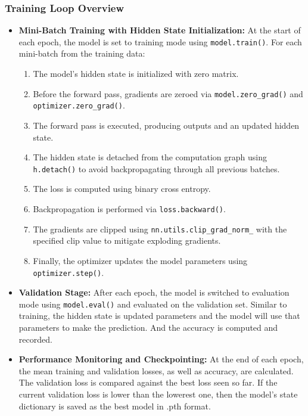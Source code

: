 \documentclass[12pt,a4paper]{article}
\begin{document}
\subsubsection{Training Loop Overview}
\begin{itemize}
    \item \textbf{Mini-Batch Training with Hidden State Initialization:}  
    At the start of each epoch, the model is set to training mode using \texttt{model.train()}. For each mini-batch from the training data:
    \begin{enumerate}
        \item The model’s hidden state is initialized with zero matrix.
        \item Before the forward pass, gradients are zeroed via \texttt{model.zero\_grad()} and \texttt{optimizer.zero\_grad()}.
        \item The forward pass is executed, producing outputs and an updated hidden state.
        \item The hidden state is detached from the computation graph using \texttt{h.detach()} to avoid backpropagating through all previous batches.
        \item The loss is computed using binary cross entropy.
        \item Backpropagation is performed via \texttt{loss.backward()}.
        \item The gradients are clipped using \texttt{nn.utils.clip\_grad\_norm\_} with the specified clip value to mitigate exploding gradients.
        \item Finally, the optimizer updates the model parameters using \texttt{optimizer.step()}.
    \end{enumerate}
    
    \item \textbf{Validation Stage:}  
    After each epoch, the model is switched to evaluation mode using \texttt{model.eval()} and evaluated on the validation set. Similar to training, the hidden state is updated parameters and the model will use that parameters to make the prediction. And the accuracy is computed and recorded.
    
    \item \textbf{Performance Monitoring and Checkpointing:}  
    At the end of each epoch, the mean training and validation losses, as well as accuracy, are calculated. The validation loss is compared against the best loss seen so far. If the current validation loss is lower than the lowerest one, then the model's state dictionary is saved as the best model in .pth format. 
\end{itemize}
\end{document}
